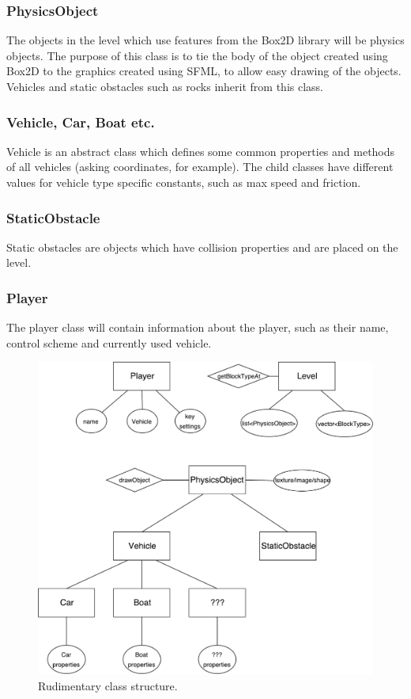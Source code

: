 \documentclass{article}
\begin{document}
\subsubsection*{PhysicsObject}
The objects in the level which use features from the Box2D library will be physics objects. The purpose of this class is to tie the body of the object created using Box2D to the graphics created using SFML, to allow easy drawing of the objects. Vehicles and static obstacles such as rocks inherit from this class.

\subsubsection*{Vehicle, Car, Boat etc.}
Vehicle is an abstract class which defines some common properties and methods of all vehicles (asking coordinates, for example). The child classes have different values for vehicle type specific constants, such as max speed and friction.

\subsubsection*{StaticObstacle}
Static obstacles are objects which have collision properties and are placed on the level.

\subsubsection*{Player}
The player class will contain information about the player, such as their name, control scheme and currently used vehicle.

\begin{figure}[h]
\centering
\includegraphics[width=\textwidth]{classes.pdf}
\caption{Rudimentary class structure.}
\end{figure}
\end{document}
